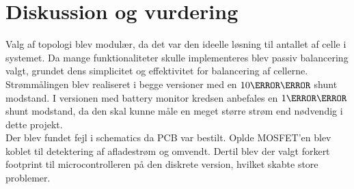 \chapter{Diskussion og vurdering}\label{kap:diskussion}
Valg af topologi blev modulær, da det var den ideelle løsning til antallet af celle i systemet. Da mange funktionaliteter skulle implementeres blev passiv balancering valgt, grundet dens simplicitet og effektivitet for balancering af cellerne.
\\

Strømmålingen blev realiseret i begge versioner med en $10\milli\ohm$ shunt modstand. I versionen med battery monitor kredsen anbefales en $1\milli\ohm$ shunt modstand, da den skal kunne måle en meget større strøm end nødvendig i dette projekt. 
\\

Der blev fundet fejl i schematics da PCB var bestilt. Oplde MOSFET'en blev koblet til detektering af afladestrøm og omvendt. Dertil blev der valgt forkert footprint til microcontrolleren på den diskrete version, hvilket skabte store problemer. 
